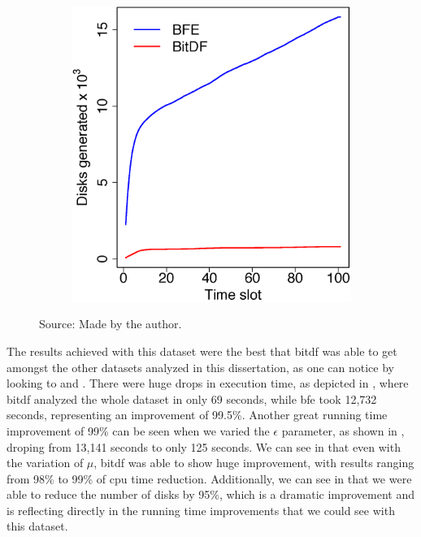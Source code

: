 {\begin{figure}[h!]
\begin{subfigure}[t]{0.48\textwidth}
        \includegraphics[width=\textwidth]{images/Brinkhoff_d.eps}
        \label{fig:brinkhoff_disks}
    \end{subfigure}
    \footnotesize{Source: Made by the author.}
    \label{fig:brinkhoff_results2}
\end{figure}

The results achieved with this dataset were the best that \ac{bitdf} was able to get amongst the other datasets analyzed
in this dissertation, as one can notice by looking to  and
. There were huge drops in execution time, as depicted in ,
where \ac{bitdf} analyzed the whole dataset in only 69 seconds, while \ac{bfe} took 12,732 seconds, representing an
improvement of 99.5\%. Another great running time improvement of 99\% can be seen when we varied the $\epsilon$
parameter, as shown in , droping from 13,141 seconds to only 125 seconds. We can see in
 that even with the variation of $\mu$, \ac{bitdf} was able to show huge improvement, with
results ranging from 98\% to 99\% of \ac{cpu} time reduction. Additionally, we can see in 
that we were able to reduce the number of disks by 95\%, which is a dramatic improvement and is reflecting directly in
the running time improvements that we could see with this dataset.
\vfill

}
